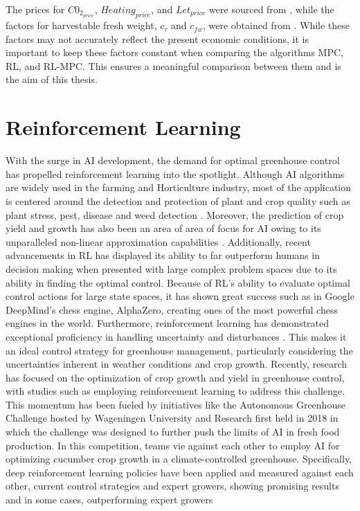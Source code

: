 The prices for $C0_{2_{price}}$, $Heating_{price}$, and $Let_{price}$ were sourced from \cite{vandenbemdRobustDeepReinforcement}, while the factors for harvestable fresh weight, $c_{\tau}$ and $c_{fw}$, were obtained from \cite{hentenGreenhouseClimateManagement1994}. While these factors may not accurately reflect the present economic conditions, it is important to keep these factors constant when comparing the algorithms MPC, RL, and RL-MPC. This ensures a meaningful comparison between them and is the aim of this thesis.


\section{Reinforcement Learning}

With the surge in AI development, the demand for optimal greenhouse control has propelled reinforcement learning into the spotlight. Although AI algorithms are widely used in the farming and Horticulture industry, most of the application is centered around the detection and protection of plant and crop quality such as plant stress, pest, disease and weed detection \cite{hemmingCherryTomatoProduction2020}. Moreover, the prediction of crop yield and growth has also been an area of area of focus for AI owing to its unparalleled non-linear approximation capabilities \cite{gongDeepLearningBased2021}. Additionally, recent advancements in RL has displayed its ability to far outperform humans in decision making when presented with large complex problem spaces \cite{bonsaiWhyReinforcementLearning2017} due to its ability in finding the optimal control. Because of RL's ability to evaluate optimal control actions for large state spaces, it has shown great success such as in Google DeepMind's chess engine, AlphaZero, creating ones of the most powerful chess engines in the world. Furthermore, reinforcement learning has demonstrated exceptional proficiency in handling uncertainty and disturbances \cite{daaboulUncertaintyPredictionModelbased2020}. This makes it an ideal control strategy for greenhouse management, particularly considering the uncertainties inherent in weather conditions and crop growth. Recently, research has focused on the optimization of crop growth and yield in greenhouse control, with studies such as \cite{ajagekarDeepReinforcementLearning2022,wangDeepReinforcementLearning2020,ajagekarEnergyefficientAIbasedControl2023,decardi-nelsonbenjaminImprovingResourceUse2023,zhangRobustModelbasedReinforcement2021,jansenOptimalControlLettuce2023,vanmourikPlantPerformancePrecision2023} employing reinforcement learning to address this challenge. This momentum has been fueled by initiatives like the Autonomous Greenhouse Challenge hosted by Wageningen University and Research first held in 2018 in which the challenge was designed to further push the limits of AI in fresh food production. In this competition, teams vie against each other to employ AI for optimizing cucumber crop growth in a climate-controlled greenhouse. Specifically, deep reinforcement learning policies have been applied and measured against each other, current control strategies and expert growers, showing promising results and in some cases, outperforming expert growers 